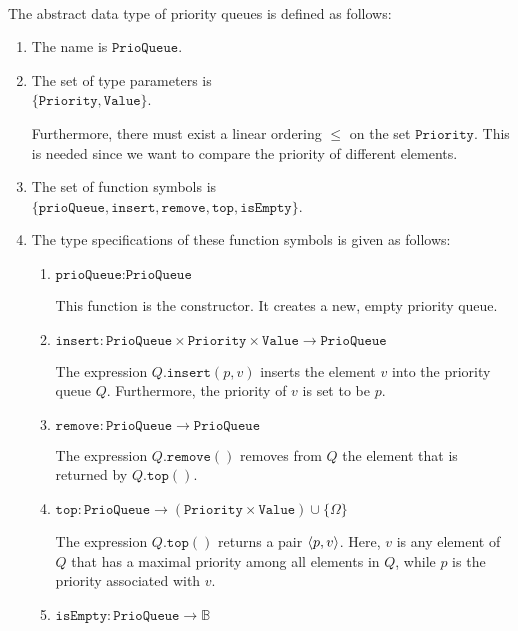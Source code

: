 \begin{Definition} \hspace*{\fill} \\
  The abstract data type of priority queues is defined as follows:
  \begin{enumerate}
  \item The name is $\texttt{PrioQueue}$.
  \item The set of type parameters is \\[0.1cm]
        \hspace*{1.3cm} $\{ \texttt{Priority}, \texttt{Value} \}$.

        Furthermore, there must exist a linear ordering $\leq$ on the set $\texttt{Priority}$.
        This is needed since we want to compare the priority of different elements.
  \item The set of function symbols is \\[0.1cm]
       \hspace*{1.3cm} 
       $\{ \texttt{prioQueue}, \texttt{insert}, \texttt{remove}, \texttt{top}, \texttt{isEmpty} \}$.
  \item The type specifications of these function symbols is given as follows:
        \begin{enumerate}
        \item $\texttt{prioQueue}: \texttt{PrioQueue}$

              This function is the constructor. It creates a new, empty priority queue.
        \item $\texttt{insert}: \texttt{PrioQueue} \times \texttt{Priority} \times \texttt{Value} \rightarrow \texttt{PrioQueue}$

              The expression $Q.\texttt{insert}(p,v)$ inserts the  element $v$ into the priority queue $Q$.
              Furthermore, the priority of $v$ is set to be $p$.
        \item $\texttt{remove}: \texttt{PrioQueue} \rightarrow \texttt{PrioQueue}$

              The expression $Q.\texttt{remove}()$ removes from $Q$ the element that is returned by
              $Q.\texttt{top}()$.
        \item $\texttt{top}: \texttt{PrioQueue}  \rightarrow (\texttt{Priority} \times \texttt{Value}) \cup \{\Omega\}$

              The expression $Q.\texttt{top}()$ returns a pair $\pair(p,v)$.  Here,  $v$ is any
              element of $Q$ that has a  maximal priority among all elements in $Q$, while $p$ is
              the priority associated with $v$. 
        \item $\texttt{isEmpty}: \texttt{PrioQueue} \rightarrow \mathbb{B}$


\end{enumerate}
\end{enumerate}
\end{Definition}
